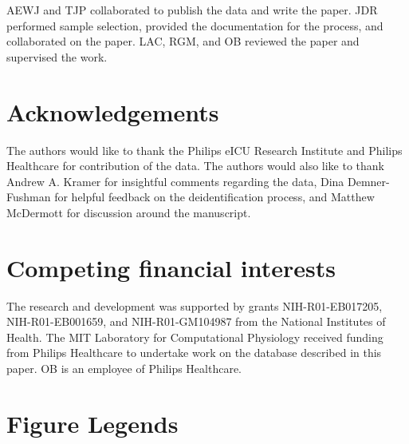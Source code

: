 \documentclass[english]{article}
\begin{document}
AEWJ and TJP collaborated to publish the data and write the paper. JDR performed sample selection, provided the documentation for the process, and collaborated on the paper. LAC, RGM, and OB reviewed the paper and supervised the work.

\section*{Acknowledgements}\label{acknowledgments}


The authors would like to thank the Philips eICU Research Institute and
Philips Healthcare for contribution of the data. The authors would also like to thank Andrew A. Kramer for insightful comments regarding the data, Dina Demner-Fushman for helpful feedback on the deidentification process, and Matthew McDermott for discussion around the manuscript.

\section*{Competing financial interests}\label{competing-interests}

The research and development was supported by grants NIH-R01-EB017205, NIH-R01-EB001659, and NIH-R01-GM104987 from the National Institutes of Health. The MIT Laboratory for Computational Physiology received funding from Philips Healthcare to undertake work on the database described in this paper. OB is an employee of Philips Healthcare.

\section*{Figure Legends}

\end{document}
